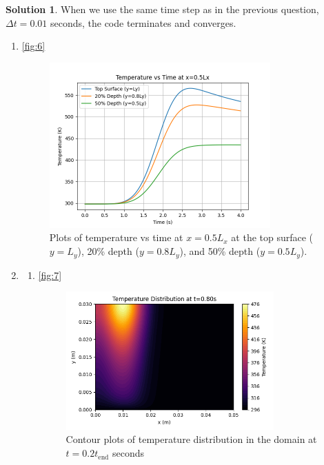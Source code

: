 \documentclass[12pt]{article}
\theoremstyle{definition} %
\newtheorem{solution}{Solution}
\theoremstyle{plain} %
\begin{document}
\begin{solution}
\noindent

When we use the same time step as in the previous question, $\Delta t=0.01$ seconds, the code terminates and converges.
     \begin{enumerate}
        \item \autoref{fig:6} \begin{figure}[htbp]
            \centering
            \includegraphics[width=0.8\textwidth]{classes/tam-470/06-10/proj-2.3.1.png}
            \caption{Plots of temperature vs time at $x = 0.5L_x$ at the top surface ($y = L_y$), 20\% depth ($y = 0.8L_y$), and 50\% depth ($y = 0.5L_y$).}
            \label{fig:6}
        \end{figure}
        \item \begin{enumerate}
           \item  \autoref{fig:7} \begin{figure}[htbp]
            \centering
            \includegraphics[width=0.8\textwidth]{classes/tam-470/06-10/proj-2.3.2.png}
            \caption{Contour plots of temperature distribution in the domain at $t = 0.2t_\text{end}$ seconds}

\end{figure}
\end{enumerate}
\end{enumerate}
\end{solution}
\end{document}
